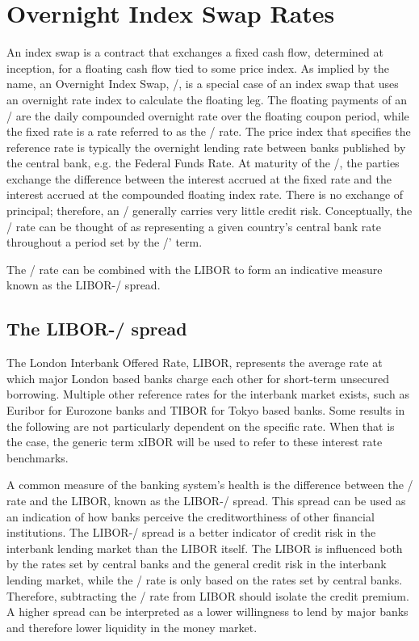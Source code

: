 \documentclass[main.tex]{subfiles}
\begin{document}
    \section{Overnight Index Swap Rates}
    
    An index swap is a contract that exchanges a fixed cash flow, determined at inception,
    for a floating cash flow tied to some price index.
    As implied by the name, an Overnight Index Swap, \OIS/, is a special case of an index swap
    that uses an overnight rate index to calculate the floating leg.
    The floating payments of an \OIS/ are the daily compounded overnight rate 
    over the floating coupon period,
    while the fixed rate is a rate referred to as the \OIS/ rate.
    The price index that specifies the reference rate is typically the overnight 
    lending rate between banks published by the central bank, e.g. the Federal Funds Rate.
    At maturity of the \OIS/, the parties exchange the difference between the interest accrued 
    at the fixed rate and the interest accrued at the compounded floating index rate.
    There is no exchange of principal; 
    therefore, an \OIS/ generally carries very little credit risk. 
    Conceptually, the \OIS/ rate can be thought of as representing a given country's
    central bank rate throughout a period set by the \OIS/' term. 

    The \OIS/ rate can be combined with the LIBOR to form an indicative measure
    known as the LIBOR-\OIS/ spread.

    \subsection{The LIBOR-\OIS/ spread}

    The London Interbank Offered Rate, LIBOR, represents the average rate 
    at which major London based banks charge each other for short-term unsecured borrowing.
    Multiple other reference rates for the interbank market exists, 
    such as Euribor for Eurozone banks and TIBOR for Tokyo based banks.
    Some results in the following are not particularly dependent on the specific rate.
    When that is the case, the generic term xIBOR will be used 
    to refer to these interest rate benchmarks.

    A common measure of the banking system's health is the difference between the \OIS/ rate
    and the LIBOR, known as the LIBOR-\OIS/ spread.
    This spread can be used as an indication of how banks perceive the creditworthiness
    of other financial institutions. 
    The LIBOR-\OIS/ spread is a better indicator of credit risk in the interbank lending market
    than the LIBOR itself. 
    The LIBOR is influenced both by the rates set by central banks and 
    the general credit risk in the interbank lending market,
    while the \OIS/ rate is only based on the rates set by central banks.
    Therefore, subtracting the \OIS/ rate from LIBOR should isolate the credit premium.
    A higher spread can be interpreted as a lower willingness to lend by major banks
    and therefore lower liquidity in the money market.
\end{document}
